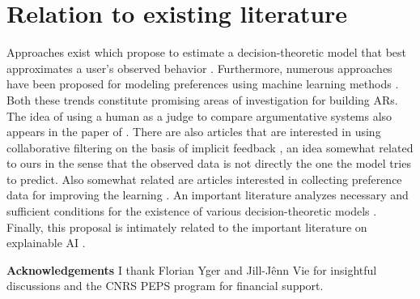 \documentclass[french, english]{da2pl2018}
\begin{document}

\section{Relation to existing literature}
\label{sec:litt}
Approaches exist which propose to estimate a decision-theoretic model that best approximates a user’s observed behavior \citep{greco_trends_2010, sobrie_learning_2018}. 
Furthermore, numerous approaches have been proposed for modeling preferences using machine learning methods \citep{furnkranz_preference_2010}. Both these trends constitute promising areas of investigation for building \acp{AR}.
The idea of using a human as a judge to compare argumentative systems also appears in the paper of \citep{irving_ai_2018}.
There are also articles that are interested in using collaborative filtering on the basis of implicit feedback \citep{rendle_bpr:_2009, hu_collaborative_2008}, an idea somewhat related to ours in the sense that the observed data is not directly the one the model tries to predict.
Also somewhat related are articles interested in collecting preference data for improving the learning \citep{sepliarskaia_preference_2018}.
An important literature analyzes necessary and sufficient conditions for the existence of various decision-theoretic models \citep{krantz_foundations_1971, gonzales_additive_1996, bouyssou_consolidated_2015}.
Finally, this proposal is intimately related to the important literature on explainable AI \citep{DBLP:journals/corr/abs-1804-11192}.

\textbf{Acknowledgements} I thank Florian Yger and Jill-Jênn Vie for insightful discussions and the CNRS PEPS program for financial support.



\appendix
\end{document}
